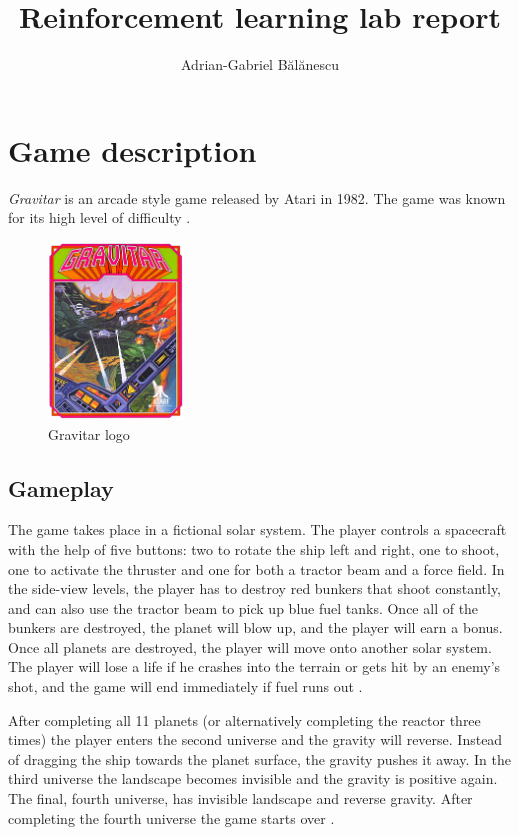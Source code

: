 \documentclass[12pt,a4paper]{report}
\author{Adrian-Gabriel Bălănescu}
\title{Reinforcement learning lab report}
\begin{document}
	\maketitle
	\tableofcontents
	
	\chapter{Game description}
		\emph{Gravitar} is an arcade style game released by Atari in 1982. The game was known for its high level of difficulty \cite{noauthor_gravitar_2021}.
		
		\begin{figure}
			\begin{center}
				\includegraphics[width=0.32\textwidth]{Gravitar.png}
			\end{center}
			\caption{Gravitar logo}
		\end{figure}
		
		\section{Gameplay}
	
		The game takes place in a fictional solar system. The player controls a spacecraft with the help of five buttons: two to rotate the ship left and right, one to shoot, one to activate the thruster and one for both a tractor beam and a force field. In the side-view levels, the player has to destroy red bunkers that shoot constantly, and can also use the tractor beam to pick up blue fuel tanks. Once all of the bunkers are destroyed, the planet will blow up, and the player will earn a bonus. Once all planets are destroyed, the player will move onto another solar system.
		The player will lose a life if he crashes into the terrain or gets hit by an enemy's shot, and the game will end immediately if fuel runs out \cite{noauthor_gravitar_2021}.
		
		
		After completing all 11 planets (or alternatively completing the reactor three times) the player enters the second universe and the gravity will reverse. Instead of dragging the ship towards the planet surface, the gravity pushes it away. In the third universe the landscape becomes invisible and the gravity is positive again. The final, fourth universe, has invisible landscape and reverse gravity. After completing the fourth universe the game starts over
		 \cite{noauthor_gravitar_2021}.
		 
\end{document}
